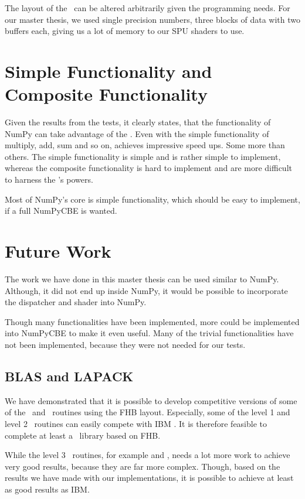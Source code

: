 The layout of the \LS\ can be altered arbitrarily given the
programming needs. For our master thesis, we used single precision
numbers, three blocks of data with two buffers each, giving us a lot
of memory to our SPU shaders to use.

\section{Simple Functionality and Composite Functionality}

Given the results from the tests, it clearly states, that the
functionality of NumPy can take advantage of the \CBE{}. Even with the
simple functionality of multiply, add, sum and so on, achieves
impressive speed ups. Some more than others. The simple functionality
is simple and is rather simple to implement, whereas the composite
functionality is hard to implement and are more difficult to harness
the \CBE{}'s powers.

Most of NumPy's core is simple functionality, which should be easy to
implement, if a full NumPyCBE is wanted. 

\section{Future Work}

The work we have done in this master thesis can be used similar to
NumPy. Although, it did not end up inside NumPy, it would be possible
to incorporate the dispatcher and shader into NumPy.

Though many functionalities have been implemented, more could be
implemented into NumPyCBE to make it even useful. Many of the trivial
functionalities have not been implemented, because they were not
needed for our tests. 

\subsection{BLAS and LAPACK}

We have demonstrated that it is possible to develop competitive
versions of some of the \BLAS\ and \LAPACK\ routines using the FHB
layout. Especially, some of the level 1 and level 2 \BLAS\ routines
can easily compete with IBM \BLAS{}. It is therefore feasible to
complete at least a \BLAS\ library based on FHB.

While the level 3 \BLAS\ routines, for example  and
, needs a lot more work to achieve very good results,
because they are far more complex. Though, based on the results we
have made with our implementations, it is possible to achieve at least
as good results as IBM.

